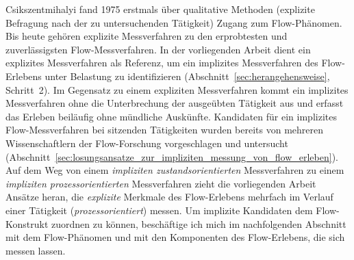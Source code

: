 

Csikszentmihalyi fand 1975 erstmals über qualitative Methoden (explizite Befragung nach der zu untersuchenden Tätigkeit) Zugang zum Flow-Phänomen. Bis heute gehören explizite Messverfahren zu den erprobtesten und zuverlässigsten Flow-Messverfahren. In der vorliegenden Arbeit dient ein explizites Messverfahren als Referenz, um ein implizites Messverfahren des Flow-Erlebens unter Belastung zu identifizieren (Abschnitt~\ref{sec:herangehensweise}, Schritt~2). Im Gegensatz zu einem expliziten Messverfahren kommt ein implizites Messverfahren ohne die Unterbrechung der ausgeübten Tätigkeit aus und erfasst das Erleben beiläufig ohne mündliche Auskünfte. Kandidaten für ein implizites Flow-Messverfahren bei sitzenden Tätigkeiten wurden bereits von mehreren Wissenschaftlern der Flow-Forschung vorgeschlagen und untersucht (Abschnitt~\ref{sec:losungsansatze_zur_impliziten_messung_von_flow_erleben}). Auf dem Weg von einem \emph{impliziten zustandsorientierten} Messverfahren zu einem \emph{impliziten prozessorientierten} Messverfahren zieht die vorliegenden Arbeit Ansätze heran, die \emph{explizite} Merkmale des Flow-Erlebens mehrfach im Verlauf einer Tätigkeit (\emph{prozessorientiert}) messen. Um implizite Kandidaten dem Flow-Konstrukt zuordnen zu können, beschäftige ich mich im nachfolgenden Abschnitt mit dem Flow-Phänomen und mit den Komponenten des Flow-Erlebens, die sich messen lassen. 
